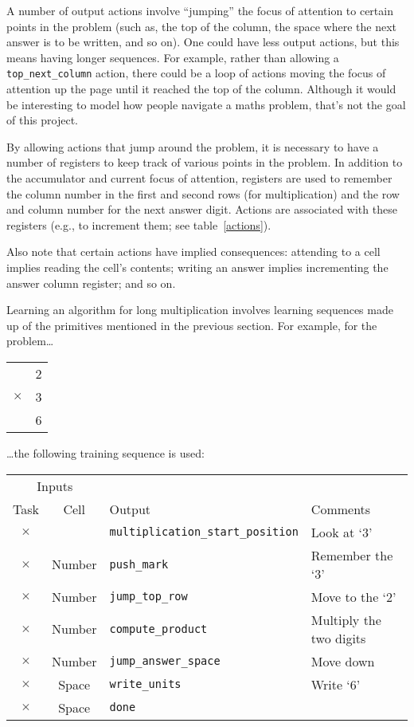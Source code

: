A number of output actions involve ``jumping'' the focus of attention to
certain points in the problem (such as, the top of the column, the space
where the next answer is to be written, and so on). One could have less
output actions, but this means having longer sequences.  For example,
rather than allowing a \verb|top_next_column| action, there could be a loop
of actions moving the focus of attention up the page until it reached the
top of the column.  Although it would be interesting to model how people
navigate a maths problem, that's not the goal of this project.

By allowing actions that jump around the problem, it is necessary to have a
number of registers to keep track of various points in the problem. In
addition to the accumulator and current focus of attention, registers are
used to remember the column number in the first and second rows (for
multiplication) and the row and column number for the next answer digit.
Actions are associated with these registers (e.g., to increment them; see
table~\ref{actions}).

Also note that certain actions have implied consequences: attending to a
cell implies reading the cell's contents; writing an answer implies
incrementing the answer column register; and so on.







Learning an algorithm for long multiplication involves learning sequences
made up of the primitives mentioned in the previous section. For example,
for the problem\ldots

\begin{tabular}{ll}
&2\\
$\times$&3\\
\cline{1-2}
&6\\
\end{tabular}

\ldots the following training sequence is used:
\begin{center}
\begin{tabular}{ccll}
\multicolumn{2}{c}{Inputs}&&\\
Task&Cell&Output&Comments\\\hline
$\times$&&\verb|multiplication_start_position|&Look at `3'\\
$\times$&Number&\verb|push_mark|&Remember the `3'\\
$\times$&Number&\verb|jump_top_row|&Move to the `2'\\
$\times$&Number&\verb|compute_product|&Multiply the two digits\\
$\times$&Number&\verb|jump_answer_space|&Move down\\
$\times$&Space&\verb|write_units|&Write `6'\\
$\times$&Space&\verb|done|&\\
\end{tabular}
\end{center}

